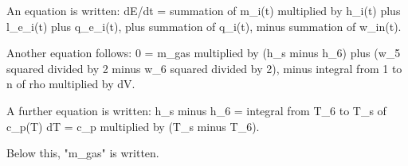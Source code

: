 An equation is written:  
dE/dt = summation of m_i(t) multiplied by h_i(t) plus l_e_i(t) plus q_e_i(t), plus summation of q_i(t), minus summation of w_in(t).  

Another equation follows:  
0 = m_gas multiplied by (h_s minus h_6) plus (w_5 squared divided by 2 minus w_6 squared divided by 2), minus integral from 1 to n of rho multiplied by dV.  

A further equation is written:  
h_s minus h_6 = integral from T_6 to T_s of c_p(T) dT = c_p multiplied by (T_s minus T_6).  

Below this, "m_gas" is written.